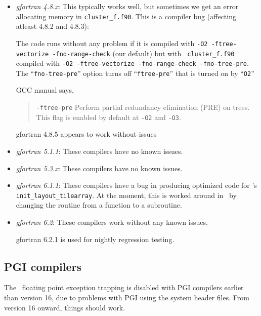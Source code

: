 \begin{itemize}

\item {\em gfortran 4.8.x}: This typically works well, but sometimes we get
an error allocating memory in {\tt cluster\_f.f90}.  This
is a compiler bug (affecting atleast 4.8.2 and 4.8.3):

The code runs without any problem if it is compiled with {\tt -O2
-ftree-vectorize -fno-range-check} (our default) but with {\tt
cluster\_f.f90} compiled with {\tt -O2 -ftree-vectorize
-fno-range-check -fno-tree-pre}.  The ``{\tt fno-tree-pre}'' option
turns off ``{\tt ftree-pre}'' that is turned on by ``{\tt O2}''
 
GCC manual says,

\begin{quote}
{\tt -ftree-pre} \newline
Perform partial redundancy elimination (PRE) on trees. This flag is enabled by default at {\tt -O2} and {\tt -O3}.
\end{quote}

gfortran 4.8.5 appears to work without issues


\item {\em gfortran 5.1.1}: These compilers have no known issues.

\item {\em gfortran 5.3.x}: These compilers have no known issues.

\item {\em gfortran 6.1.1}: These compilers have a bug in producing
  optimized code for \boxlib's {\tt init\_layout\_tilearray}.  At the
  moment, this is worked around in \boxlib\ by changing the routine
  from a function to a subroutine.

\item {\em gfortran 6.2}: These compilers work without any known issues.

  gfortran 6.2.1 is used for nightly regression testing.

\end{itemize}

\subsection{PGI compilers}

The \boxlib\ floating point exception trapping is disabled with PGI
compilers earlier than version 16, due to problems with PGI using the
system header files.  From version 16 onward, things should work.

